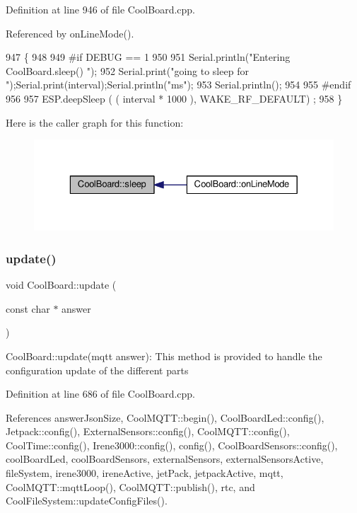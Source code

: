 Definition at line 946 of file Cool\+Board.\+cpp.



Referenced by on\+Line\+Mode().


\begin{DoxyCode}
947 \{
948 
949 \textcolor{preprocessor}{#if DEBUG == 1}
950 
951     Serial.println(\textcolor{stringliteral}{"Entering CoolBoard.sleep() "});
952     Serial.print(\textcolor{stringliteral}{"going to sleep for "});Serial.print(interval);Serial.println(\textcolor{stringliteral}{"ms"});
953     Serial.println();
954 
955 \textcolor{preprocessor}{#endif}
956 
957     ESP.deepSleep ( ( interval * 1000 ), WAKE\_RF\_DEFAULT) ;
958 \}
\end{DoxyCode}
Here is the caller graph for this function\+:
\nopagebreak
\begin{figure}[H]
\begin{center}
\leavevmode
\includegraphics[width=329pt]{classCoolBoard_a5d0c8ff93b615efd676be432de9f164a_icgraph}
\end{center}
\end{figure}
\mbox{\label{classCoolBoard_a8612756d3f73198cdde857a66f0fe690}} 
\subsubsection{\texorpdfstring{update()}{update()}}
{\footnotesize\ttfamily void Cool\+Board\+::update (\begin{DoxyParamCaption}\item[{const char $\ast$}]{answer }\end{DoxyParamCaption})}

Cool\+Board\+::update(mqtt answer)\+: This method is provided to handle the configuration update of the different parts 

Definition at line 686 of file Cool\+Board.\+cpp.



References answer\+Json\+Size, Cool\+M\+Q\+T\+T\+::begin(), Cool\+Board\+Led\+::config(), Jetpack\+::config(), External\+Sensors\+::config(), Cool\+M\+Q\+T\+T\+::config(), Cool\+Time\+::config(), Irene3000\+::config(), config(), Cool\+Board\+Sensors\+::config(), cool\+Board\+Led, cool\+Board\+Sensors, external\+Sensors, external\+Sensors\+Active, file\+System, irene3000, irene\+Active, jet\+Pack, jetpack\+Active, mqtt, Cool\+M\+Q\+T\+T\+::mqtt\+Loop(), Cool\+M\+Q\+T\+T\+::publish(), rtc, and Cool\+File\+System\+::update\+Config\+Files().



